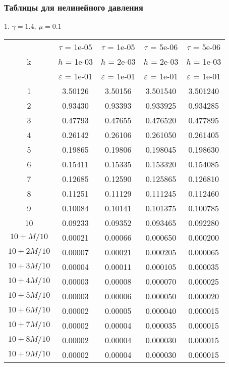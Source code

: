 \subsubsection{Таблицы для нелинейного давления}
1. $\gamma = 1.4, \ \mu = 0.1$
\begin{center}
	\begin{tabular}{ |c|c|c|c|c| } 
		\hline
		& $\tau$ = 1e-05 & $\tau$ = 1e-05 & $\tau$ = 5e-06 & $\tau$ = 5e-06 \\ 
		k & $h$ = 1e-03 & $h$ = 2e-03 & $h$ = 2e-03 & $h$ = 1e-03 \\ 
		& $\varepsilon$ = 1e-01 & $\varepsilon$ = 1e-01 & $\varepsilon$ = 1e-01 & $\varepsilon$ = 1e-01 \\ 
		\hline
		1 & 3.50126 & 3.50156 & 3.501540 & 3.501240 \\
		\hline
		2 & 0.93430 & 0.93393 & 0.933925 & 0.934285 \\
		\hline
		3 & 0.47793 & 0.47655 & 0.476520 & 0.477895 \\
		\hline
		4 & 0.26142 & 0.26106 & 0.261050 & 0.261405 \\
		\hline
		5 & 0.19865 & 0.19806 & 0.198045 & 0.198630 \\
		\hline
		6 & 0.15411 & 0.15335 & 0.153320 & 0.154085 \\
		\hline
		7 & 0.12685 & 0.12590 & 0.125865 & 0.126810 \\
		\hline
		8 & 0.11251 & 0.11129 & 0.111245 & 0.112460 \\
		\hline
		9 & 0.10084 & 0.10141 & 0.101375 & 0.100785 \\
		\hline
		10 & 0.09233 & 0.09352 & 0.093465 & 0.092280 \\
		\hline
		$10 + M/10$ & 0.00021 & 0.00066 & 0.000650 & 0.000200 \\
		\hline
		$10 + 2M/10$ & 0.00007 & 0.00021 & 0.000205 & 0.000065 \\
		\hline
		$10 + 3M/10$ & 0.00004 & 0.00011 & 0.000105 & 0.000035 \\
		\hline
		$10 + 4M/10$ & 0.00003 & 0.00008 & 0.000070 & 0.000025 \\
		\hline
		$10 + 5M/10$ & 0.00003 & 0.00006 & 0.000050 & 0.000020 \\
		\hline
		$10 + 6M/10$ & 0.00002 & 0.00005 & 0.000040 & 0.000015 \\
		\hline
		$10 + 7M/10$ & 0.00002 & 0.00004 & 0.000035 & 0.000015 \\
		\hline
		$10 + 8M/10$ & 0.00002 & 0.00004 & 0.000030 & 0.000015 \\
		\hline
		$10 + 9M/10$ & 0.00002 & 0.00004 & 0.000030 & 0.000015 \\
		\hline
	\end{tabular}
\end{center}

